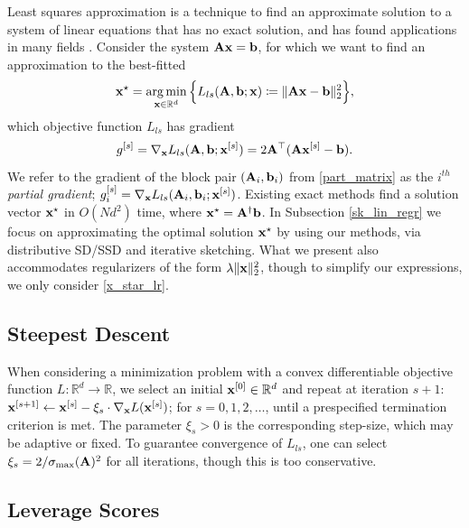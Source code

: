 \documentclass[journal,letterpaper,onecolumn,twoside,nofonttune]{IEEEtran}
\newcommand{\R}{\mathbb{R}}
\newcommand{\bb}{\bold{b}}
\newcommand{\xb}{\bold{x}}
\newcommand{\Ab}{\bold{A}}
\DeclareMathOperator*{\argmin}{arg\,min}
\begin{document}
Least squares approximation is a technique to find an approximate solution to a system of linear equations that has no exact solution, and has found applications in many fields \cite{DMMS11}. Consider the system $\Ab\xb=\bb$, for which we want to find an approximation to the best-fitted
\begin{equation}
\label{x_star_lr}
  \xb^\star = \argmin_{\xb\in\R^d}\Big\{L_{ls}(\Ab,\bb;\xb)\coloneqq\|\Ab\xb-\bb\|_2^2\Big\},
\end{equation}
which objective function $L_{ls}$ has gradient 
\begin{equation}
\label{gr_ls}
  g^{[s]}=\nabla_{\xb}L_{ls}(\Ab,\bb;\xb^{[s]}) = 2\Ab^\top(\Ab\xb^{[s]}-\bb).
\end{equation}
We refer to the gradient of the block pair $(\Ab_i,\bb_i)$ from \eqref{part_matrix} as the $i^{th}$ \textit{partial gradient}; $g_i^{[s]}=\nabla_{\xb}L_{ls}(\Ab_i,\bb_i;\xb^{[s]})$. Existing exact methods find a solution vector $\xb^\star$ in $O(Nd^2)$ time, where $\xb^\star=\Ab^{\dagger}\bb$. In Subsection \ref{sk_lin_regr} we focus on approximating the optimal solution $\xb^\star$ by using our methods, via distributive SD/SSD and iterative sketching. What we present also accommodates regularizers of the form $\lambda\|\xb\|_2^2$, though to simplify our expressions, we only consider \eqref{x_star_lr}.

\subsection{Steepest Descent}

When considering a minimization problem with a convex differentiable objective function $L\colon\R^d\to\R$, we select an initial $\xb^{[0]}\in\R^d$ and repeat at iteration $s+1$: $\xb^{[s+1]}\gets\xb^{[s]}-\xi_s\cdot\nabla_{\xb}L(\xb^{[s]})$; for $s=0,1,2,\ldots$, until a prespecified termination criterion is met. The parameter $\xi_s>0$ is the corresponding step-size, which may be adaptive or fixed. To guarantee convergence of $L_{ls}$, one can select $\xi_s=2/\sigma_{\text{max}}(\Ab)^2$ for all iterations, though this is too conservative.

\subsection{Leverage Scores}
\end{document}

